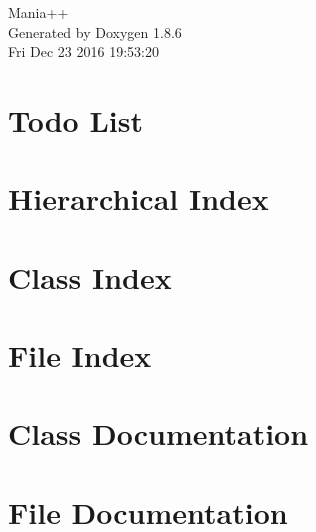 \documentclass[twoside]{book}
\newcommand{\clearemptydoublepage}{%
  \newpage{\pagestyle{empty}\cleardoublepage}%
}
\begin{document}
\hypersetup{pageanchor=false}
\begin{titlepage}
\vspace*{7cm}
\begin{center}%
{\Large Mania++ }\\
\vspace*{1cm}
{\large Generated by Doxygen 1.8.6}\\
\vspace*{0.5cm}
{\small Fri Dec 23 2016 19:53:20}\\
\end{center}
\end{titlepage}
\clearemptydoublepage
\tableofcontents
\clearemptydoublepage
{}
\hypersetup{pageanchor=true}

\chapter{Todo List}
\label{todo}
\hypertarget{todo}{}

\chapter{Hierarchical Index}

\chapter{Class Index}

\chapter{File Index}

\chapter{Class Documentation}



















\chapter{File Documentation}

























\newpage
{}
{}
\printindex
\end{document}
